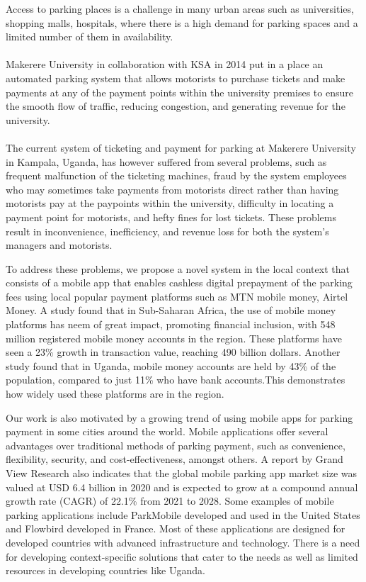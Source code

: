 Access to parking places is a  challenge in many urban areas such as universities, shopping malls, hospitals, where there is a high demand for parking spaces and a limited number of them in availability\cite{parmar_study_2020}.\\\\
Makerere University in collaboration with KSA in 2014 put in a place an automated parking system that allows motorists to purchase tickets and make payments at any of the payment points within the university premises to ensure the smooth flow of traffic, reducing congestion, and generating revenue for the university\cite{wamai_mak_2014}.\\\\ The current system of ticketing and payment for parking at Makerere University in Kampala, Uganda, has however suffered from several problems, such as frequent malfunction of the ticketing machines, fraud by the system employees who may sometimes take payments from motorists direct rather than having motorists pay at the paypoints within the university, difficulty in locating a payment point for motorists, and hefty fines for lost tickets. These problems result in inconvenience, inefficiency, and revenue loss for both the system’s managers and motorists.

To address these problems, we propose a novel system in the local context that consists of a mobile app that enables cashless digital prepayment of the parking fees using local popular payment platforms such as MTN mobile money, Airtel Money. A study found that in Sub-Saharan Africa, the use of mobile money platforms has neem of great impact, promoting financial inclusion, with 548 million registered mobile money accounts in the region. These platforms have seen a 23\% growth in transaction value, reaching 490 billion dollars\cite{centellegher_mobile_2018}. Another study found that in Uganda, mobile money accounts are held by 43\% of the population, compared to just 11\% who have bank accounts\cite{baah_state_2021}.This demonstrates how widely used these platforms are in the region.


Our work is also motivated by a growing trend of using mobile apps for parking payment in some cities around the world. Mobile applications offer several advantages over traditional methods of parking payment, such as convenience, flexibility, security, and cost-effectiveness, amongst others. A report by Grand View Research also indicates that the global mobile parking app market size was valued at USD 6.4 billion in 2020 and is expected to grow at a compound annual growth rate (CAGR) of 22.1\% from 2021 to 2028\cite{GrandViewResearch2023}. Some examples of mobile parking applications include ParkMobile \cite{ParkMobile2023} developed and used in the United States and Flowbird developed in France\cite{Flowbird2023}. Most of these applications are designed for developed countries with advanced infrastructure and technology. There is a need for developing context-specific solutions that cater to the needs as well as limited resources in developing countries like Uganda.


